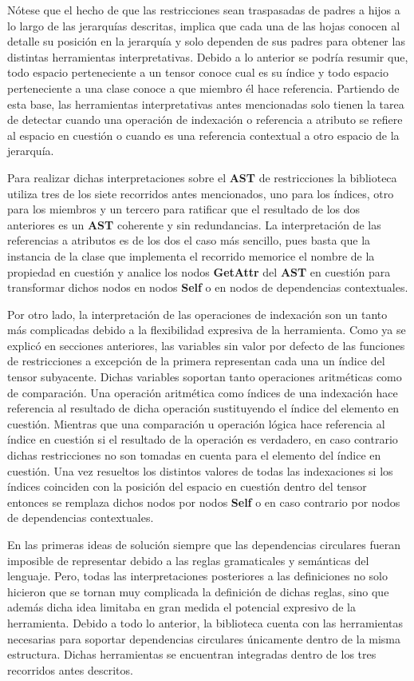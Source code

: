 Nótese que el hecho de que las restricciones sean traspasadas de padres a hijos a lo largo de las jerarquías descritas, implica que
cada una de las hojas conocen al detalle su posición en la jerarquía y solo dependen de sus padres para obtener las distintas
herramientas interpretativas. Debido a lo anterior se podría resumir que, todo espacio perteneciente a un tensor conoce cual es
su índice y todo espacio perteneciente a una clase conoce a que miembro él hace referencia. Partiendo de esta base, las herramientas
interpretativas antes mencionadas solo tienen la tarea de detectar cuando una operación de indexación o referencia a atributo se refiere
al espacio en cuestión o cuando es una referencia contextual a otro espacio de la jerarquía.

Para realizar dichas interpretaciones sobre el {\bf AST} de restricciones la biblioteca utiliza tres de los siete recorridos antes mencionados,
uno para los índices, otro para los miembros y un tercero para ratificar que el resultado de los dos anteriores es un {\bf AST} coherente y sin
redundancias. La interpretación de las referencias a atributos es de los dos el caso más sencillo, pues basta que la instancia de la
clase que implementa el recorrido memorice el nombre de la propiedad en cuestión y analice los nodos {\bf GetAttr} del {\bf AST} en cuestión
para transformar dichos nodos en nodos {\bf Self} o en nodos de dependencias contextuales.

Por otro lado, la interpretación de las operaciones de indexación son un tanto más complicadas debido a la flexibilidad expresiva de
la herramienta. Como ya se explicó en secciones anteriores, las variables sin valor por defecto de las funciones de restricciones a
excepción de la primera representan cada una un índice del tensor subyacente. Dichas variables soportan tanto operaciones aritméticas
como de comparación. Una operación aritmética como índices de una indexación hace referencia al resultado de dicha operación sustituyendo
el índice del elemento en cuestión. Mientras que una comparación u operación lógica hace referencia al índice en cuestión si el resultado
de la operación es verdadero, en caso contrario dichas restricciones no son tomadas en cuenta para el elemento del índice en cuestión.
Una vez resueltos los distintos valores de todas las indexaciones si los índices coinciden con la posición del espacio en cuestión dentro
del tensor entonces se remplaza dichos nodos por nodos {\bf Self} o en caso contrario por nodos de dependencias contextuales.

En las primeras ideas de solución siempre que las dependencias circulares fueran imposible de representar debido a
las reglas gramaticales y semánticas del lenguaje. Pero, todas las interpretaciones posteriores a las definiciones no solo hicieron
que se tornan muy complicada la definición de dichas reglas, sino que además dicha idea limitaba en gran
medida el potencial expresivo de la herramienta. Debido a todo lo anterior, la biblioteca cuenta con las herramientas necesarias para
soportar dependencias circulares únicamente dentro de la misma estructura. Dichas herramientas se encuentran integradas dentro de los
tres recorridos antes descritos.

